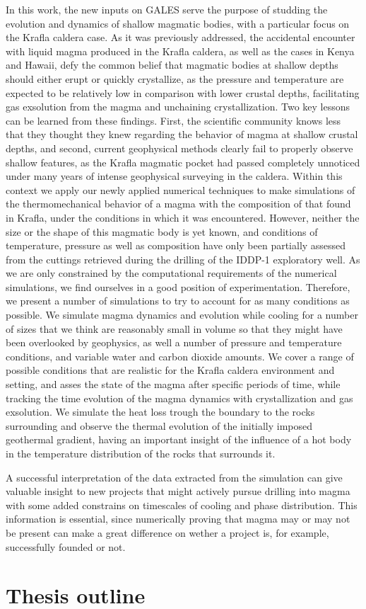 In this work, the new inputs on GALES serve the purpose of studding the evolution and dynamics of shallow magmatic bodies, with a particular focus on the Krafla caldera case. As it was previously addressed, the accidental encounter with liquid magma produced in the Krafla caldera, as well as the cases in Kenya and Hawaii, defy the common belief that magmatic bodies at shallow depths should either erupt or quickly crystallize, as the pressure and temperature are expected to  be relatively low in comparison with lower crustal depths, facilitating gas exsolution from the magma and unchaining crystallization. Two key lessons can be learned from these findings. First, the scientific community knows less that they thought they knew regarding the behavior of magma at shallow crustal depths, and second, current geophysical methods clearly fail to properly observe shallow features, as the Krafla magmatic pocket had passed completely unnoticed under many years of intense geophysical surveying in the caldera. Within this context we apply our newly applied numerical techniques to make simulations of the thermomechanical behavior of a magma with the composition of that found in Krafla, under the conditions in which it was encountered. However, neither the size or the shape of this magmatic body is yet known, and conditions of temperature, pressure as well as composition have only been partially assessed from the cuttings retrieved during the drilling of the IDDP-1 exploratory well. As we are only constrained by the computational requirements of the numerical simulations, we find ourselves in a good position of experimentation. Therefore, we present a number of simulations to try to account for as many conditions as possible. We simulate magma dynamics and evolution while cooling for a number of sizes that we think are reasonably small in volume so that they might have been overlooked by geophysics, as well a number of pressure and temperature conditions, and variable water and carbon dioxide amounts. We cover a range of possible conditions that are realistic for the Krafla caldera environment and setting, and asses the state of the magma after specific periods of time, while tracking the time evolution of the magma dynamics with crystallization and gas exsolution. We simulate the heat loss trough the boundary to the rocks surrounding and observe the thermal evolution of the initially imposed geothermal gradient, having an important insight of the influence of a hot body in the temperature distribution of the rocks that surrounds it.

A successful interpretation of the data extracted from the simulation can give valuable insight to new projects that might actively pursue drilling into magma with some added constrains on timescales of cooling and phase distribution. This information is essential, since numerically proving that magma may or may not be present can make a great difference on wether a project is, for example, successfully founded or not.

\section*{Thesis outline}
